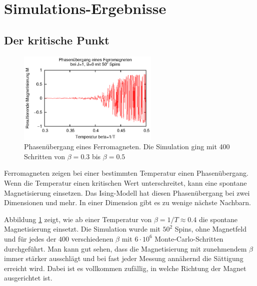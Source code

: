 \section{Simulations-Ergebnisse}

\subsection{Der kritische Punkt}
\begin{figure}
  \includegraphics[width=0.6\textwidth]{bilder/critical/critical.eps}
  \caption{Phasenübergang eines Ferromagneten. Die Simulation ging mit 400 Schritten von $\beta=0.3$ bis $\beta=0.5$ \label{phase}}
\end{figure}
Ferromagneten zeigen bei einer bestimmten Temperatur einen Phasenübergang. Wenn die Temperatur einen kritischen Wert unterschreitet, kann eine spontane Magnetisierung einsetzen.
Das Ising-Modell hat diesen Phasenübergang bei zwei Dimensionen und mehr. In einer Dimension gibt es zu wenige nächste Nachbarn.

Abbildung \ref{phase} zeigt, wie ab einer Temperatur von $\beta=1/T\approx0.4$ die spontane Magnetisierung einsetzt.
Die Simulation wurde mit $50^2$ Spins, ohne Magnetfeld und für jedes der $400$ verschiedenen $\beta$ mit $6\cdot10^6$ Monte-Carlo-Schritten durchgeführt.
Man kann gut sehen, dass die Magnetisierung mit zunehmendem $\beta$ immer stärker ausschlägt und bei fast jeder Messung annähernd die Sättigung erreicht wird.
Dabei ist es vollkommen zufällig, in welche Richtung der Magnet ausgerichtet ist.


